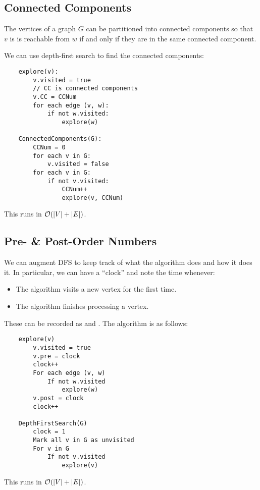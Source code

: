 \documentclass[letterpaper]{article}
\begin{document}
\subsection{Connected Components}
\begin{theorem}{}{}
    The vertices of a graph $G$ can be partitioned into connected components so that $v$ is is reachable from $w$ if and only if they are in the same connected component. 
\end{theorem}

We can use depth-first search to find the connected components:
\begin{verbatim}
    explore(v):
        v.visited = true 
        // CC is connected components
        v.CC = CCNum 
        for each edge (v, w):
            if not w.visited: 
                explore(w)

    ConnectedComponents(G):
        CCNum = 0
        for each v in G:
            v.visited = false
        for each v in G: 
            if not v.visited: 
                CCNum++
                explore(v, CCNum)
\end{verbatim}
This runs in $\mathcal{O}(|V| + |E|)$. 

\subsection{Pre- \& Post-Order Numbers}
We can augment DFS to keep track of what the algorithm does and how it does it. In particular, we can have a ``clock'' and note the time whenever:
\begin{itemize}
    \item The algorithm visits a new vertex for the first time. 
    \item The algorithm finishes processing a vertex.
\end{itemize}
These can be recorded as  and . The algorithm is as follows:
\begin{verbatim}
    explore(v)
        v.visited = true 
        v.pre = clock 
        clock++
        For each edge (v, w)
            If not w.visited
                explore(w)
        v.post = clock 
        clock++

    DepthFirstSearch(G)
        clock = 1
        Mark all v in G as unvisited
        For v in G
            If not v.visited
                explore(v)
\end{verbatim}
This runs in $\mathcal{O}(|V| + |E|)$. 
\end{document}
